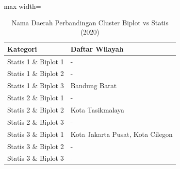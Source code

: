 \begin{table}[H]
\centering
\caption{Nama Daerah Perbandingan Cluster Biplot vs Statis (2020)} \label{tab:biplot_statis_name_2020}
\begin{adjustbox}{max width=\textwidth}
\begin{tabular}{|p{4cm}|p{10cm}|}
\hline
\textbf{Kategori} & \textbf{Daftar Wilayah} \\
\hline
Statis 1 \& Biplot 1 & - \\
\hline
Statis 1 \& Biplot 2 & - \\
\hline
Statis 1 \& Biplot 3 & Bandung Barat \\
\hline
Statis 2 \& Biplot 1 & - \\
\hline
Statis 2 \& Biplot 2 & Kota Tasikmalaya \\
\hline
Statis 2 \& Biplot 3 & - \\
\hline
Statis 3 \& Biplot 1 & Kota Jakarta Pusat, Kota Cilegon \\
\hline
Statis 3 \& Biplot 2 & - \\
\hline
Statis 3 \& Biplot 3 & - \\
\hline
\end{tabular}
\end{adjustbox}
\end{table}